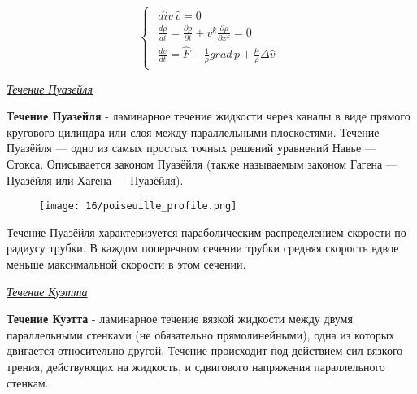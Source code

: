 \begin{equation} \label{eq:task}
  \begin{cases}
    \begin{array}{l}
      div \, \hat{v} = 0                                                                              \\
      \frac{d\rho}{dt} = \frac{\partial \rho}{\partial t} + v^k\frac{\partial \rho}{\partial x^k} = 0 \\
      \frac{dv}{dt} = \hat{F} - \frac{1}{\rho}grad\, p + \frac{\mu}{\rho}\Delta \hat{v}
    \end{array}
  \end{cases}
\end{equation}

\begin{center}
  \textit{\underline{Течение Пуазейля}}
\end{center}

\begin{defn}
  \textbf{Течение Пуазейля} - ламинарное течение жидкости через каналы в виде прямого кругового цилиндра или слоя между параллельными плоскостями. Течение Пуазёйля — одно из самых простых точных решений уравнений Навье — Стокса. Описывается законом Пуазёйля (также называемым законом Гагена — Пуазёйля или Хагена — Пуазёйля).
\end{defn}

\begin{figure}[H]
  \centering
  \texttt{[image: 16/poiseuille\_profile.png]}
\end{figure}

Течение Пуазёйля характеризуется параболическим распределением скорости по радиусу трубки. В каждом поперечном сечении трубки средняя скорость вдвое меньше максимальной скорости в этом сечении.


\begin{center}
  \textit{\underline{Течение Куэтта}}
\end{center}

\begin{defn}
  \textbf{Течение Куэтта} - ламинарное течение вязкой жидкости между двумя параллельными стенками (не обязательно прямолинейными), одна из которых двигается относительно другой. Течение происходит под действием сил вязкого трения, действующих на жидкость, и сдвигового напряжения параллельного стенкам.
\end{defn}


